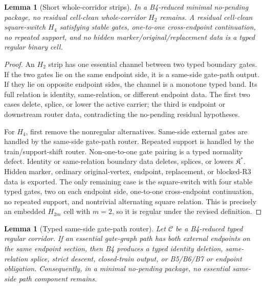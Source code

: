 \documentclass[11pt]{amsart}
\newtheorem{lemma}[theorem]{Lemma}
\theoremstyle{definition}
\begin{document}
\begin{lemma}[Short whole-corridor strips]
In a B4-reduced minimal no-pending package, no residual cell-clean whole-corridor \(H_2\) remains. A residual cell-clean square-switch \(H_4\) satisfying stable gates, one-to-one cross-endpoint continuation, no repeated support, and no hidden marker/original/replacement data is a typed regular binary cell.

\end{lemma}
\begin{proof}
An \(H_2\) strip has one essential channel between two typed boundary gates. If the two gates lie on the same endpoint side, it is a same-side gate-path output. If they lie on opposite endpoint sides, the channel is a monotone typed band. Its full relation is identity, same-relation, or different endpoint data. The first two cases delete, splice, or lower the active carrier; the third is endpoint or downstream router data, contradicting the no-pending residual hypotheses.

For \(H_4\), first remove the nonregular alternatives. Same-side external gates are handled by the same-side gate-path router. Repeated support is handled by the train/support-shift router. Non-one-to-one gate pairing is a typed normality defect. Identity or same-relation boundary data deletes, splices, or lowers \(\mathfrak K^\ast\). Hidden marker, ordinary original-vertex, endpoint, replacement, or blocked-R3 data is exported. The only remaining case is the square-switch with four stable typed gates, two on each endpoint side, one-to-one cross-endpoint continuation, no repeated support, and nontrivial alternating square relation. This is precisely an embedded \(H_{2m}\) cell with \(m=2\), so it is regular under the revised definition.

\end{proof}
\begin{lemma}[Typed same-side gate-path router]
Let \(\mathcal C\) be a B4-reduced typed regular corridor. If an essential gate-graph path has both external endpoints on the same endpoint section, then B4 produces a typed identity deletion, same-relation splice, strict descent, closed-train output, or B5/B6/B7 or endpoint obligation. Consequently, in a minimal no-pending package, no essential same-side path component remains.

\end{lemma}
\end{document}
